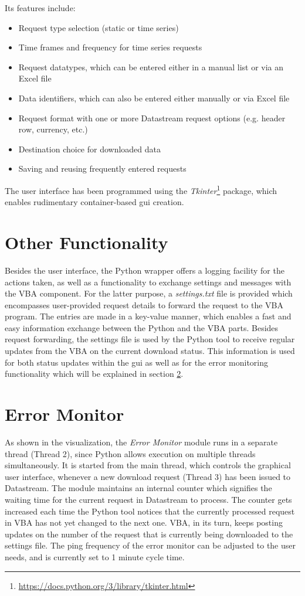 Its features include: 
\begin{itemize}
	\item Request type selection (static or time series)
	\item Time frames and frequency for time series requests
	\item Request datatypes, which can be entered either in a manual list or via an Excel file
	\item Data identifiers, which can also be entered either manually or via Excel file
	\item Request format with one or more Datastream request options (e.g. header row, currency, etc.)
	\item Destination choice for downloaded data
	\item Saving and reusing frequently entered requests
\end{itemize}

The user interface has been programmed using the \textit{Tkinter}\footnote{\url{https://docs.python.org/3/library/tkinter.html}} package, which enables rudimentary container-based gui creation. 

\section{Other Functionality} \label{section:other-functionality}
Besides the user interface, the Python wrapper offers a logging facility for the actions taken, as well as a functionality to exchange settings and messages with the VBA component. For the latter purpose, a \textit{settings.txt} file is provided which encompasses user-provided request details to forward the request to the VBA program. The entries are made in a key-value manner, which enables a fast and easy information exchange between the Python and the VBA parts. Besides request forwarding, the settings file is used by the Python tool to receive regular updates from the VBA on the current download status. This information is used for both status updates within the gui as well as for the error monitoring functionality which will be explained in section \ref{section:error-monitor}. 

\section{Error Monitor} \label{section:error-monitor}
As shown in the visualization, the \textit{Error Monitor} module runs in a separate thread (Thread 2), since Python allows execution on multiple threads simultaneously. It is started from the main thread, which controls the graphical user interface, whenever a new download request (Thread 3) has been issued to Datastream. The module maintains an internal counter which signifies the waiting time for the current request in Datastream to process. The counter gets increased each time the Python tool notices that the currently processed request in VBA has not yet changed to the next one. VBA, in its turn, keeps posting updates on the number of the request that is currently being downloaded to the settings file. The ping frequency of the error monitor can be adjusted to the user needs, and is currently set to 1 minute cycle time. 

